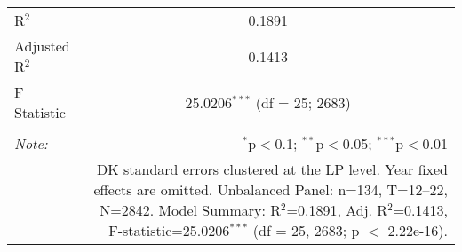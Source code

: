\begin{table}[!htbp]
\begin{tabular}{@{\extracolsep{5pt}}lc}
R$^{2}$ & 0.1891 \\ 
Adjusted R$^{2}$ & 0.1413 \\ 
F Statistic & 25.0206$^{***}$ (df = 25; 2683) \\ 
\hline 
\hline \\[-1.8ex] 
\textit{Note:}  & \multicolumn{1}{r}{$^{*}$p$<$0.1; $^{**}$p$<$0.05; $^{***}$p$<$0.01} \\ 
 & \multicolumn{1}{r}{DK standard errors clustered at the LP level. Year fixed effects are omitted. Unbalanced Panel: n=134, T=12--22, N=2842. Model Summary: R$^{2}$=0.1891, Adj. R$^{2}$=0.1413, F-statistic=25.0206$^{***}$ (df = 25, 2683; p $<$ 2.22e-16).} \\ 
\end{tabular} 
\end{table} 
